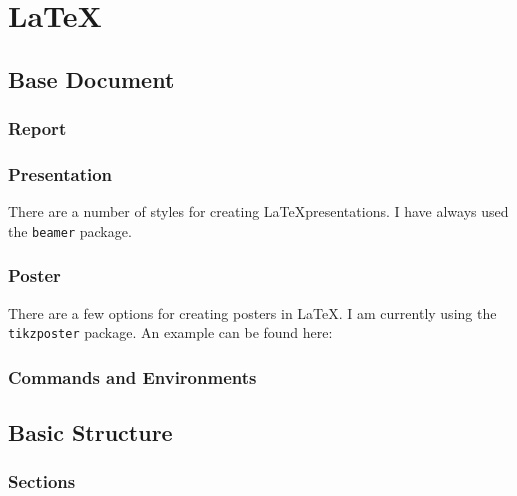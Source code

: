 \chapter{\LaTeX}
\label{latex}

\section{Base Document}

\subsection{Report}
\subsection{Presentation}

There are a number of styles for creating \LaTeX presentations. I have always used the \texttt{beamer} package.


\subsection{Poster}

There are a few options for creating posters in \LaTeX. I am currently using the \texttt{tikzposter} package. An example can be found here:


\subsection{Commands and Environments}



\section{Basic Structure}
\subsection{Sections}

